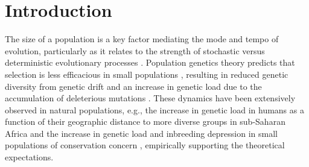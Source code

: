 \section*{Introduction}

The size of a population is a key factor mediating the mode and tempo of evolution,
particularly as it relates to the strength of stochastic versus deterministic
evolutionary processes \citep{kimura_mutation_1963,gillespie_genetic_2000}.
Population genetics theory predicts that selection is less efficacious in small populations
\citep{charlesworth_effective_2009,gravel_when_2016}, resulting in reduced genetic
diversity from genetic drift and an increase in genetic load due to the accumulation
of deleterious mutations \citep{lande_risk_1994,lynch_mutation_1995,dussex_purging_2023}.
These dynamics have been extensively observed in natural populations, e.g., the
increase in genetic load in humans as a function of their geographic distance to more
diverse groups in sub-Saharan Africa \citep{henn_distance_2016} and the increase in
genetic load and inbreeding depression in small populations of conservation concern
\citep{lande_genetics_1988,westemeier_prairiechicken_1998,frankham_genetics_2005,
kardos_inbreeding_2023}, empirically supporting the theoretical expectations.
\vspace{0.1cm}

